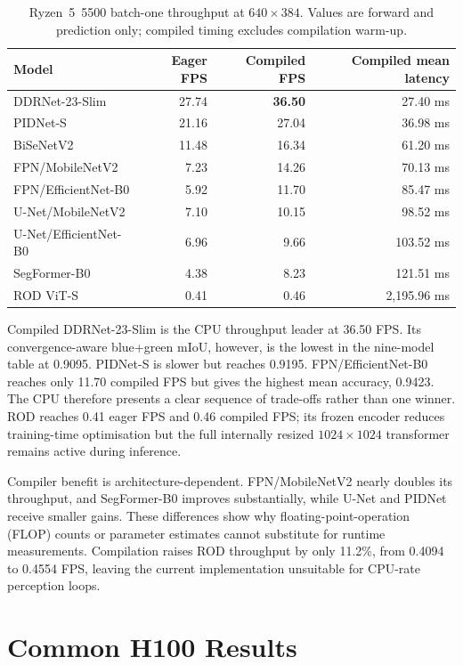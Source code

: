 \begin{table}[H]
\centering
\caption{Ryzen~5~5500 batch-one throughput at $640\times384$. Values are
forward and prediction only; compiled timing excludes compilation warm-up.}
\label{tab:cpu_comparison}
\small
\begin{tabular}{@{}lrrr@{}}
\toprule
\textbf{Model} & \textbf{Eager FPS} & \textbf{Compiled FPS} & \textbf{Compiled mean latency} \\
\midrule
DDRNet-23-Slim & 27.74 & \textbf{36.50} & 27.40 ms \\
PIDNet-S & 21.16 & 27.04 & 36.98 ms \\
BiSeNetV2 & 11.48 & 16.34 & 61.20 ms \\
FPN/MobileNetV2 & 7.23 & 14.26 & 70.13 ms \\
FPN/EfficientNet-B0 & 5.92 & 11.70 & 85.47 ms \\
U-Net/MobileNetV2 & 7.10 & 10.15 & 98.52 ms \\
U-Net/EfficientNet-B0 & 6.96 & 9.66 & 103.52 ms \\
SegFormer-B0 & 4.38 & 8.23 & 121.51 ms \\
ROD ViT-S & 0.41 & 0.46 & 2,195.96 ms \\
\bottomrule
\end{tabular}
\end{table}

Compiled DDRNet-23-Slim is the CPU throughput leader at 36.50 FPS. Its
convergence-aware blue+green mIoU, however, is the lowest in the nine-model
table at 0.9095. PIDNet-S is slower but reaches 0.9195.
FPN/EfficientNet-B0 reaches only 11.70 compiled FPS but gives the highest mean
accuracy, 0.9423. The CPU therefore presents a clear sequence of trade-offs
rather than one winner. ROD reaches 0.41 eager FPS and 0.46 compiled FPS; its
frozen encoder reduces training-time optimisation but the full internally
resized $1024\times1024$ transformer remains active during inference.

Compiler benefit is architecture-dependent. FPN/MobileNetV2 nearly doubles its
throughput, and SegFormer-B0 improves substantially, while U-Net and PIDNet
receive smaller gains. These differences show why floating-point-operation
(FLOP) counts or parameter estimates cannot substitute for runtime
measurements. Compilation raises ROD throughput by only 11.2\%, from 0.4094 to
0.4554 FPS, leaving the current implementation unsuitable for CPU-rate
perception loops.

\section{Common H100 Results}


